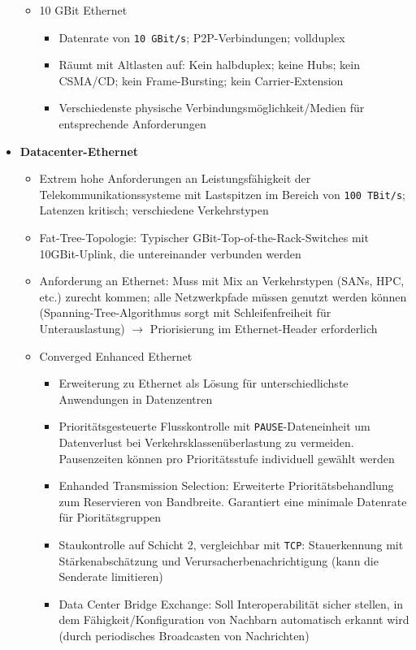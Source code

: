\begin{itemize}
\begin{itemize}
		\item 10 GBit Ethernet
		\begin{itemize}
			\item Datenrate von \texttt{10 GBit/s}; P2P-Verbindungen; vollduplex
			\item Räumt mit Altlasten auf: Kein halbduplex; keine Hubs; kein CSMA/CD; kein Frame-Bursting; kein Carrier-Extension
			\item Verschiedenste physische Verbindungsmöglichkeit/Medien für entsprechende Anforderungen
		\end{itemize}
	\end{itemize}
	\item \textbf{Datacenter-Ethernet}
	\begin{itemize}
		\item Extrem hohe Anforderungen an Leistungsfähigkeit der Telekommunikationssysteme mit Lastspitzen im Bereich von \texttt{100 TBit/s}; Latenzen kritisch; verschiedene Verkehrstypen
		\item Fat-Tree-Topologie: Typischer GBit-Top-of-the-Rack-Switches mit 10GBit-Uplink, die untereinander verbunden werden
		\item Anforderung an Ethernet: Muss mit Mix an Verkehrstypen (SANs, HPC, etc.) zurecht kommen; alle Netzwerkpfade müssen genutzt werden können (Spanning-Tree-Algorithmus sorgt mit Schleifenfreiheit für Unterauslastung) \(\rightarrow\) Priorisierung im Ethernet-Header erforderlich
		\item Converged Enhanced Ethernet
		\begin{itemize}
			\item Erweiterung zu Ethernet als Lösung für unterschiedlichste Anwendungen in Datenzentren
			\item Prioritätsgesteuerte Flusskontrolle mit \texttt{PAUSE}-Dateneinheit um Datenverlust bei Verkehrsklassenüberlastung zu vermeiden. Pausenzeiten können pro Prioritätsstufe individuell gewählt werden
			\item Enhanded Transmission Selection: Erweiterte Prioritätsbehandlung zum Reservieren von Bandbreite. Garantiert eine minimale Datenrate für Pioritätsgruppen
			\item Staukontrolle auf Schicht 2, vergleichbar mit \texttt{TCP}: Stauerkennung mit Stärkenabschätzung und Verursacherbenachrichtigung (kann die Senderate limitieren)
			\item Data Center Bridge Exchange: Soll Interoperabilität sicher stellen, in dem Fähigkeit/Konfiguration von Nachbarn automatisch erkannt wird (durch periodisches Broadcasten von Nachrichten)

\end{itemize}
\end{itemize}
\end{itemize}
